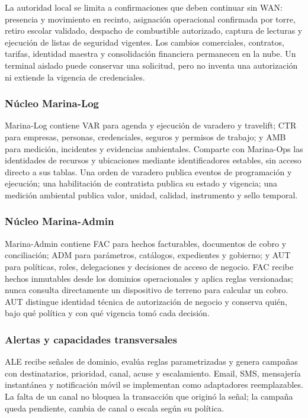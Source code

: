\documentclass[11pt,letterpaper]{report}
\begin{document}
La autoridad local se limita a confirmaciones que deben continuar sin WAN: presencia y movimiento en recinto, asignación operacional confirmada por torre, retiro escolar validado, despacho de combustible autorizado, captura de lecturas y ejecución de listas de seguridad vigentes. Los cambios comerciales, contratos, tarifas, identidad maestra y consolidación financiera permanecen en la nube. Un terminal aislado puede conservar una solicitud, pero no inventa una autorización ni extiende la vigencia de credenciales.

\subsubsection*{Núcleo Marina-Log}

Marina-Log contiene VAR para agenda y ejecución de varadero y travelift; CTR para empresas, personas, credenciales, seguros y permisos de trabajo; y AMB para medición, incidentes y evidencias ambientales. Comparte con Marina-Ops las identidades de recursos y ubicaciones mediante identificadores estables, sin acceso directo a sus tablas. Una orden de varadero publica eventos de programación y ejecución; una habilitación de contratista publica su estado y vigencia; una medición ambiental publica valor, unidad, calidad, instrumento y sello temporal.

\subsubsection*{Núcleo Marina-Admin}

Marina-Admin contiene FAC para hechos facturables, documentos de cobro y conciliación; ADM para parámetros, catálogos, expedientes y gobierno; y AUT para políticas, roles, delegaciones y decisiones de acceso de negocio. FAC recibe hechos inmutables desde los dominios operacionales y aplica reglas versionadas; nunca consulta directamente un dispositivo de terreno para calcular un cobro. AUT distingue identidad técnica de autorización de negocio y conserva quién, bajo qué política y con qué vigencia tomó cada decisión.

\subsubsection*{Alertas y capacidades transversales}

ALE recibe señales de dominio, evalúa reglas parametrizadas y genera campañas con destinatarios, prioridad, canal, acuse y escalamiento. Email, SMS, mensajería instantánea y notificación móvil se implementan como adaptadores reemplazables. La falta de un canal no bloquea la transacción que originó la señal; la campaña queda pendiente, cambia de canal o escala según su política.
\end{document}

